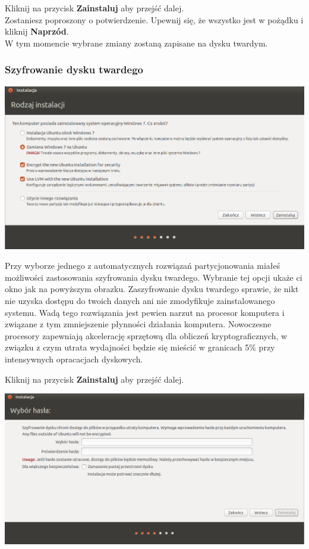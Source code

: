 \begin{flushright}
Kliknij na przycisk \textbf{Zainstaluj} aby przejść dalej.\\
Zostaniesz poproszony o potwierdzenie. Upewnij się, że wszystko jest w pożądku i kliknij \textbf{Naprzód}.\\
W tym momencie wybrane zmiany zostaną zapisane na dysku twardym.
\end{flushright}
\clearpage
\subsubsection{Szyfrowanie dysku twardego}
\begin{center}
        \includegraphics[scale=0.5]{images/instalator_partycjonowanie_szyfrowanie1.png}
\end{center}
Przy wyborze jednego z automatycznych rozwiązań partycjonowania miałeś możliwości zastosowania szyfrowania dysku twardego. Wybranie tej opcji ukaże ci okno jak na powyższym obrazku. Zaszyfrowanie dysku twardego sprawie, że nikt nie uzyska dostępu do twoich danych ani nie zmodyfikuje zainstalowanego systemu. Wadą tego rozwiązania jest pewien narzut na procesor komputera i związane z tym zmniejszenie płynności działania komputera. Nowoczesne procesory zapewniają akcelerację sprzętową dla obliczeń kryptograficznych, w związku z czym utrata wydajności będzie się mieścić w granicach 5\% przy intensywnych opracacjach dyskowych.
\begin{flushright}
Kliknij na przycisk \textbf{Zainstaluj} aby przejść dalej.
\end{flushright}
\clearpage
\begin{center}
        \includegraphics[scale=0.5]{images/instalator_partycjonowanie_szyfrowanie2.png}
\end{center}
